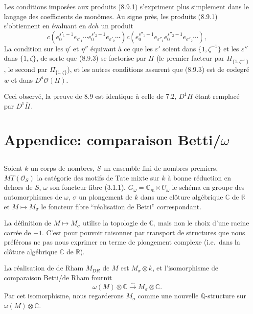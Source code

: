 \documentclass[11pt,a4paper]{article}
\theoremstyle{plain}
\theoremstyle{definition}
\newcommand{\dch}{\mathit{dch}}
\newcommand{\Gm}{\mathbb{G}_m}
\newcommand{\Q}{\mathbb{Q}}
\newcommand{\C}{\mathbb{C}}
\newcommand{\R}{\mathbb{R}}
\begin{document}
Les conditions impos\'ees aux produits (8.9.1) s'expriment plus simplement dans le langage des coefficients de mon\^omes. Au signe pr\`es, les produits (8.9.1) s'obtiennent en \'evaluant en $\dch$ un produit
\begin{equation}\label{eq:8.9.3}
c(e_0^{s'_1-1}e_{\varepsilon'_1} \cdots e_0^{s'_2-1}e_{\varepsilon'_2} \cdots)c(e_0^{s''_1-1}e_{\varepsilon''_1} e_0^{s''_2-1}e_{\varepsilon''_2} \cdots),
\end{equation}
La condition sur les $\eta'$ et $\eta''$ \'equivaut \`a ce que les $\varepsilon'$ soient dans $\{1, \zeta^{-1}\}$ et les $\varepsilon''$ dans $\{1, \zeta\}$, de sorte que (8.9.3) se factorise par $\overline{\Pi}$ (le premier facteur par $\Pi_{\{1,\zeta^{-1}\}}$, le second par $\Pi_{\{1,\zeta\}}$), et les autres conditions assurent que (8.9.3) est de codegr\'e $w$ et dans $D^d \mathcal{O}(\Pi)$.

Ceci observ\'e, la preuve de 8.9 est identique \`a celle de 7.2, $D^1\Pi$ \'etant remplac\'e par $D^1\overline{\Pi}$.

\section*{Appendice: comparaison Betti/$\omega$}
\label{sec:A}

\subsection{}
Soient $k$ un corps de nombres, $S$ un ensemble fini de nombres premiers, $MT(\mathcal{O}_S)$ la cat\'egorie des motifs de Tate mixte sur $k$ \`a bonne r\'eduction en dehors de $S$, $\omega$ son foncteur fibre (3.1.1), $G_\omega = \Gm \ltimes U_\omega$ le sch\'ema en groupe des automorphismes de $\omega$, $\sigma$ un plongement de $k$ dans une cl\^oture alg\'ebrique $\C$ de $\R$ et $M \mapsto M_\sigma$ le foncteur fibre ``r\'ealisation de Betti'' correspondant.

La d\'efinition de $M \mapsto M_\sigma$ utilise la topologie de $\C$, mais non le choix d'une racine carr\'ee de $-1$. C'est pour pouvoir raisonner par transport de structures que nous pr\'ef\'erons ne pas nous exprimer en terme de plongement complexe (i.e.~dans la cl\^oture alg\'ebrique $\C$ de $\R$).

La r\'ealisation de de Rham $M_{DR}$ de $M$ est $M_\sigma \otimes k$, et l'isomorphisme de comparaison Betti/de Rham fournit
\begin{equation}\label{eq:A.1.1}
\omega(M) \otimes \C \xrightarrow{\sim} M_\sigma \otimes \C.
\end{equation}
Par cet isomorphisme, nous regarderons $M_\sigma$ comme une nouvelle $\Q$-structure sur $\omega(M) \otimes \C$.
\end{document}
